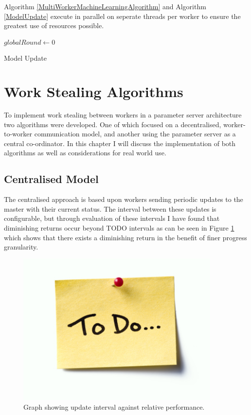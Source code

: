 \documentclass[12pt]{article}
\begin{document}
\medskip
\medskip

Algorithm \ref{MultiWorkerMachineLearningAlgorithm} and Algorithm \ref{ModelUpdate} execute in parallel on seperate threads per worker to ensure the greatest use of resources possible.
\newline

\IncMargin{1em}
\begin{algorithm}[H]
  $globalRound \longleftarrow 0$\;
 \caption{Model Update}
 \label{ModelUpdate}
\end{algorithm}
\DecMargin{1em}
\medskip

\newpage

\section{Work Stealing Algorithms}

To implement work stealing between workers in a parameter server architecture two algorithms were developed. One of which focused on a decentralised, worker-to-worker communication model, and another using the parameter server as a central co-ordinator. In this chapter I will discuss the implementation of both algorithms as well as considerations for real world use.

\subsection{Centralised Model}

The centralised approach is based upon workers sending periodic updates to the master with their current status. The interval between these updates is configurable, but through evaluation of these intervals I have found that diminishing returns occur beyond TODO intervals as can be seen in Figure \ref{IntervalGraph} which shows that there exists a diminishing return in the benefit of finer progress granularity.

\begin{figure}[H]
  \centering
  \includegraphics[width=4in]{todo}
  \caption[]{Graph showing update interval against relative performance.}
  \label{IntervalGraph}
\end{figure}
\end{document}
